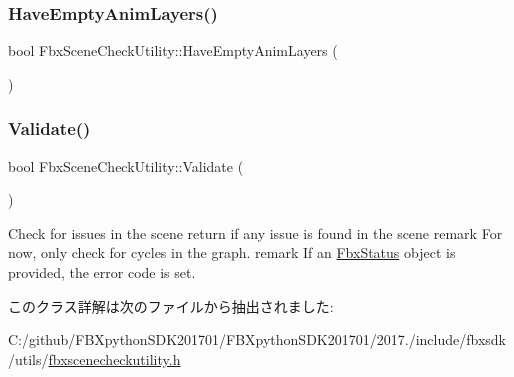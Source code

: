 \mbox{\label{class_fbx_scene_check_utility_aca14381c6153cbfe485198f7f5e378ab}} 
\subsubsection{\texorpdfstring{Have\+Empty\+Anim\+Layers()}{HaveEmptyAnimLayers()}}
{\footnotesize\ttfamily bool Fbx\+Scene\+Check\+Utility\+::\+Have\+Empty\+Anim\+Layers (\begin{DoxyParamCaption}{ }\end{DoxyParamCaption})\hspace{0.3cm}{\ttfamily [protected]}}

\mbox{\label{class_fbx_scene_check_utility_a1ab351d6f370393663719a46ee4b6eff}} 
\subsubsection{\texorpdfstring{Validate()}{Validate()}}
{\footnotesize\ttfamily bool Fbx\+Scene\+Check\+Utility\+::\+Validate (\begin{DoxyParamCaption}{ }\end{DoxyParamCaption})}

Check for issues in the scene return  if any issue is found in the scene remark For now, only check for cycles in the graph. remark If an \hyperlink{class_fbx_status}{Fbx\+Status} object is provided, the error code is set. 

このクラス詳解は次のファイルから抽出されました\+:\begin{DoxyCompactItemize}
\item 
C\+:/github/\+F\+B\+Xpython\+S\+D\+K201701/\+F\+B\+Xpython\+S\+D\+K201701/2017./include/fbxsdk/utils/\hyperlink{fbxscenecheckutility_8h}{fbxscenecheckutility.\+h}\end{DoxyCompactItemize}
